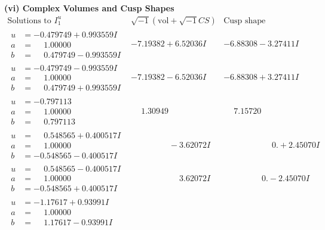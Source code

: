 \documentclass[1p]{elsarticle_modified}
\theoremstyle{definition}
\newcommand{\I}{\sqrt{-1}}
\begin{document}
\newpage\flushleft \textbf{(vi) Complex Volumes and Cusp Shapes}
$$\begin{array}{c|c|c}  
\text{Solutions to }I^u_{1}& \I (\text{vol} + \sqrt{-1}CS) & \text{Cusp shape}\\
 \hline 
\begin{aligned}
u &= -0.479749 + 0.993559 I \\
a &= \phantom{-}1.00000\phantom{ +0.000000I} \\
b &= \phantom{-}0.479749 - 0.993559 I\end{aligned}
 & -7.19382 + 6.52036 I & -6.88308 - 3.27411 I \\ \hline\begin{aligned}
u &= -0.479749 - 0.993559 I \\
a &= \phantom{-}1.00000\phantom{ +0.000000I} \\
b &= \phantom{-}0.479749 + 0.993559 I\end{aligned}
 & -7.19382 - 6.52036 I & -6.88308 + 3.27411 I \\ \hline\begin{aligned}
u &= -0.797113\phantom{ +0.000000I} \\
a &= \phantom{-}1.00000\phantom{ +0.000000I} \\
b &= \phantom{-}0.797113\phantom{ +0.000000I}\end{aligned}
 & \phantom{-}1.30949\phantom{ +0.000000I} & \phantom{-}7.15720\phantom{ +0.000000I} \\ \hline\begin{aligned}
u &= \phantom{-}0.548565 + 0.400517 I \\
a &= \phantom{-}1.00000\phantom{ +0.000000I} \\
b &= -0.548565 - 0.400517 I\end{aligned}
 & \phantom{-0.000000 } -3.62072 I & \phantom{-0.000000 -}0. + 2.45070 I \\ \hline\begin{aligned}
u &= \phantom{-}0.548565 - 0.400517 I \\
a &= \phantom{-}1.00000\phantom{ +0.000000I} \\
b &= -0.548565 + 0.400517 I\end{aligned}
 & \phantom{-0.000000 -}3.62072 I & \phantom{-0.000000 } 0. - 2.45070 I \\ \hline\begin{aligned}
u &= -1.17617 + 0.93991 I \\
a &= \phantom{-}1.00000\phantom{ +0.000000I} \\
b &= \phantom{-}1.17617 - 0.93991 I\end{aligned}

\end{array}$$
\end{document}
